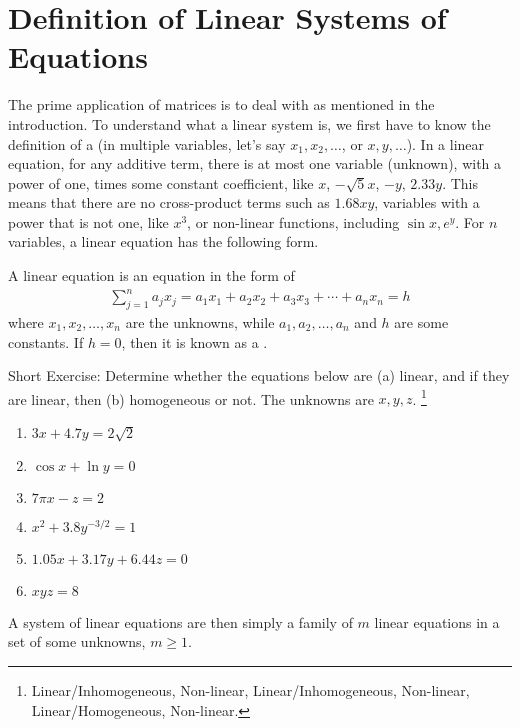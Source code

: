 \section{Definition of Linear Systems of Equations}
\label{section:deflinsys}
The prime application of matrices is to deal with  as mentioned in the introduction. To understand what a linear system is, we first have to know the definition of a  (in multiple variables, let's say $x_1, x_2, \ldots$, or $x, y, \ldots$). In a linear equation, for any additive term, there is at most one variable (unknown), with a power of one, times some constant coefficient, like $x$, $-\sqrt{5}x$, $-y$, $2.33y$. This means that there are no cross-product terms such as $1.68xy$, variables with a power that is not one, like $x^3$, or non-linear functions, including $\sin{x}, e^{y}$. For $n$ variables, a linear equation has the following form.
\begin{defn}
A linear equation is an equation in the form of
\begin{align*}
\sum_{j=1}^n a_jx_j = a_1x_1 + a_2x_2 + a_3x_3 + \cdots + a_nx_n = h
\end{align*}
where $x_1, x_2, \ldots, x_n$ are the unknowns, while $a_1, a_2, \ldots, a_n$ and $h$ are some constants. If $h = 0$, then it is known as a .
\end{defn}
Short Exercise: Determine whether the equations below are (a) linear, and if they are linear, then (b) homogeneous or not. The unknowns are $x, y, z$. \footnote{Linear/Inhomogeneous, Non-linear, Linear/Inhomogeneous, Non-linear, Linear/Homogeneous, Non-linear.}
\begin{enumerate}
    \item $3x + 4.7y = 2\sqrt{2}$ 
    \item $\cos x + \ln y = 0$
    \item $7\pi x - z = 2$ 
    \item $x^2 + 3.8y^{-3/2} = 1$
    \item $1.05x + 3.17y + 6.44z = 0$
    \item $xyz = 8$ 
\end{enumerate}
A system of linear equations are then simply a family of $m$ linear equations in a set of some unknowns, $m \geq 1$.
